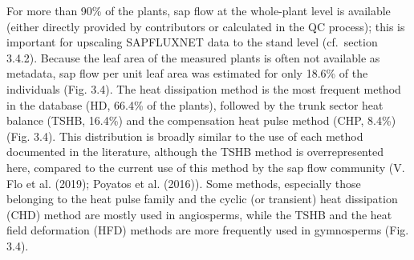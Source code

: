 \documentclass[11pt,twoside]{reedthesis}
\begin{document}
For more than 90\% of the plants, sap flow at the whole-plant level is
available (either directly provided by contributors or calculated in the
QC process); this is important for upscaling SAPFLUXNET data to the
stand level (cf.~section 3.4.2). Because the leaf area of the measured
plants is often not available as metadata, sap flow per unit leaf area
was estimated for only 18.6\% of the individuals (Fig. 3.4). The heat
dissipation method is the most frequent method in the database (HD,
66.4\% of the plants), followed by the trunk sector heat balance (TSHB,
16.4\%) and the compensation heat pulse method (CHP, 8.4\%) (Fig. 3.4).
This distribution is broadly similar to the use of each method
documented in the literature, although the TSHB method is
overrepresented here, compared to the current use of this method by the
sap flow community (V. Flo et al. (2019); Poyatos et al. (2016)). Some
methods, especially those belonging to the heat pulse family and the
cyclic (or transient) heat dissipation (CHD) method are mostly used in
angiosperms, while the TSHB and the heat field deformation (HFD) methods
are more frequently used in gymnosperms (Fig. 3.4).\par
\end{document}
